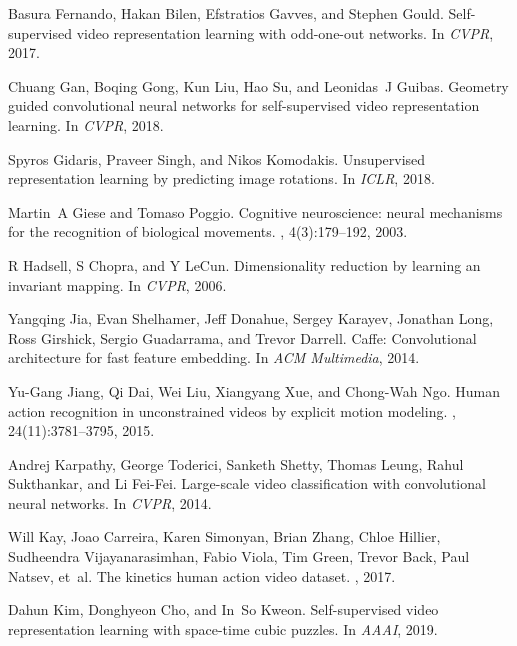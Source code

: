 \documentclass[10pt,twocolumn,letterpaper]{article}
\begin{document}
{\begin{thebibliography}{10}
Basura Fernando, Hakan Bilen, Efstratios Gavves, and Stephen Gould.
\newblock Self-supervised video representation learning with odd-one-out
  networks.
\newblock In {\em CVPR}, 2017.

Chuang Gan, Boqing Gong, Kun Liu, Hao Su, and Leonidas~J Guibas.
\newblock Geometry guided convolutional neural networks for self-supervised
  video representation learning.
\newblock In {\em CVPR}, 2018.

Spyros Gidaris, Praveer Singh, and Nikos Komodakis.
\newblock Unsupervised representation learning by predicting image rotations.
\newblock In {\em ICLR}, 2018.

Martin~A Giese and Tomaso Poggio.
\newblock Cognitive neuroscience: neural mechanisms for the recognition of
  biological movements.
, 4(3):179--192, 2003.

R Hadsell, S Chopra, and Y LeCun.
\newblock Dimensionality reduction by learning an invariant mapping.
\newblock In {\em CVPR}, 2006.

Yangqing Jia, Evan Shelhamer, Jeff Donahue, Sergey Karayev, Jonathan Long, Ross
  Girshick, Sergio Guadarrama, and Trevor Darrell.
\newblock Caffe: Convolutional architecture for fast feature embedding.
\newblock In {\em ACM Multimedia}, 2014.

Yu-Gang Jiang, Qi Dai, Wei Liu, Xiangyang Xue, and Chong-Wah Ngo.
\newblock Human action recognition in unconstrained videos by explicit motion
  modeling.
, 24(11):3781--3795, 2015.

Andrej Karpathy, George Toderici, Sanketh Shetty, Thomas Leung, Rahul
  Sukthankar, and Li Fei-Fei.
\newblock Large-scale video classification with convolutional neural networks.
\newblock In {\em CVPR}, 2014.

Will Kay, Joao Carreira, Karen Simonyan, Brian Zhang, Chloe Hillier, Sudheendra
  Vijayanarasimhan, Fabio Viola, Tim Green, Trevor Back, Paul Natsev, et~al.
\newblock The kinetics human action video dataset.
, 2017.

Dahun Kim, Donghyeon Cho, and In~So Kweon.
\newblock Self-supervised video representation learning with space-time cubic
  puzzles.
\newblock In {\em AAAI}, 2019.


\end{thebibliography}}
\end{document}
